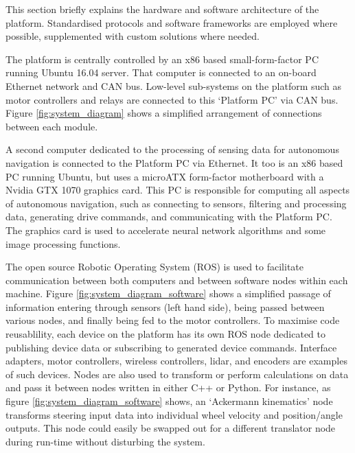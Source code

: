 \documentclass[preprint,authoryear,12pt]{elsarticle}
\begin{document}
        This section briefly explains the hardware and software architecture of the platform.
        Standardised protocols and software frameworks are employed where possible, supplemented with custom solutions where needed.

        The platform is centrally controlled by an x86 based small-form-factor PC running Ubuntu 16.04 server.
        That computer is connected to an on-board Ethernet network and CAN bus.
        Low-level sub-systems on the platform such as motor controllers and relays are connected to this `Platform PC' via CAN bus.
        Figure \ref{fig:system_diagram} shows a simplified arrangement of connections between each module.

        A second computer dedicated to the processing of sensing data for autonomous navigation is connected to the Platform PC via Ethernet.
        It too is an x86 based PC running Ubuntu, but uses a microATX form-factor motherboard with a Nvidia GTX 1070 graphics card.
        This PC is responsible for computing all aspects of autonomous navigation, such as connecting to sensors, filtering and processing data, generating drive commands, and communicating with the Platform PC.
        The graphics card is used to accelerate neural network algorithms and some image processing functions.

        The open source Robotic Operating System (ROS) is used to facilitate communication between both computers and between software nodes within each machine.
        Figure \ref{fig:system_diagram_software} shows a simplified passage of information entering through sensors (left hand side), being passed between various nodes, and finally being fed to the motor controllers.
        To maximise code reusablility, each device on the platform has its own ROS node dedicated to publishing device data or subscribing to generated device commands.
        Interface adapters, motor controllers, wireless controllers, lidar, and encoders are examples of such devices.
        Nodes are also used to transform or perform calculations on data and pass it between nodes written in either C++ or Python.
        For instance, as figure \ref{fig:system_diagram_software} shows, an `Ackermann kinematics' node transforms steering input data into individual wheel velocity and position/angle outputs.
        This node could easily be swapped out for a different translator node during run-time without disturbing the system.
\end{document}
